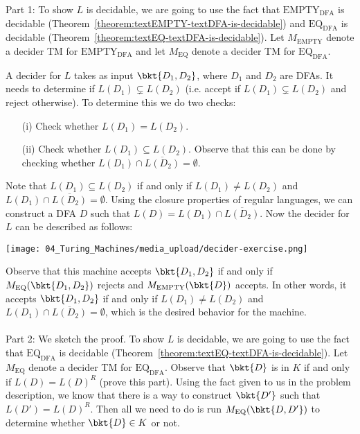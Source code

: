 \begin{solution}
\label{sol:Turing-Machines::show}
Part 1: To show $L$ is decidable, we are going to use the fact that $\mathrm{EMPTY}_\mathrm{DFA}$ is decidable (Theorem~\ref{theorem:textEMPTY-textDFA-is-decidable}) and $\mathrm{EQ}_\mathrm{DFA}$ is decidable (Theorem~\ref{theorem:textEQ-textDFA-is-decidable}). Let $M_\text{EMPTY}$ denote a decider TM for $\mathrm{EMPTY}_\mathrm{DFA}$ and let $M_\text{EQ}$ denote a decider TM for $\mathrm{EQ}_\mathrm{DFA}$.

A decider for $L$ takes as input $\bkt{D_1,D_2}$, where $D_1$ and $D_2$ are DFAs. It needs to determine if $L(D_1) \subsetneq L(D_2)$ (i.e. accept if $L(D_1) \subsetneq L(D_2)$ and reject otherwise). To determine this we do two checks:
\begin{enumerate}
    \item[(i)] Check whether $L(D_1) = L(D_2)$.
    \item[(ii)] Check whether $L(D_1) \subseteq L(D_2)$. Observe that this can be done by checking whether $L(D_1) \cap \overline{L(D_2)} = \emptyset$.
\end{enumerate}
Note that $L(D_1) \subseteq L(D_2)$ if and only if $L(D_1) \neq L(D_2)$ and $L(D_1) \cap \overline{L(D_2)} = \emptyset$. Using the closure properties of regular languages, we can construct a DFA $D$ such that $L(D) = L(D_1) \cap \overline{L(D_2)}$. Now the decider for $L$ can be described as follows:
\begin{center}
    \texttt{[image: 04\_Turing\_Machines/media\_upload/decider-exercise.png]}
\end{center}
Observe that this machine accepts $\bkt{D_1,D_2}$ if and only if  $M_\text{EQ}(\bkt{D_1,D_2})$ rejects and $M_\text{EMPTY}(\bkt{D})$ accepts. In other words, it accepts $\bkt{D_1,D_2}$ if and only if $L(D_1) \neq L(D_2)$ and $L(D_1) \cap \overline{L(D_2)} = \emptyset$, which is the desired behavior for the machine.
\\\\
\noindent
Part 2: We sketch the proof. To show $L$ is decidable, we are going to use the fact that $\mathrm{EQ}_\mathrm{DFA}$ is decidable (Theorem~\ref{theorem:textEQ-textDFA-is-decidable}). Let $M_\text{EQ}$ denote a decider TM for $\mathrm{EQ}_\mathrm{DFA}$. Observe that $\bkt{D}$ is in $K$ if and only if $L(D) = L(D)^R$ (prove this part). Using the fact given to us in the problem description, we know that there is a way to construct $\bkt{D'}$ such that $L(D') = L(D)^R$. Then all we need to do is run $M_\text{EQ}(\bkt{D, D'})$ to determine whether $\bkt{D} \in K$ or not.

\end{solution}

